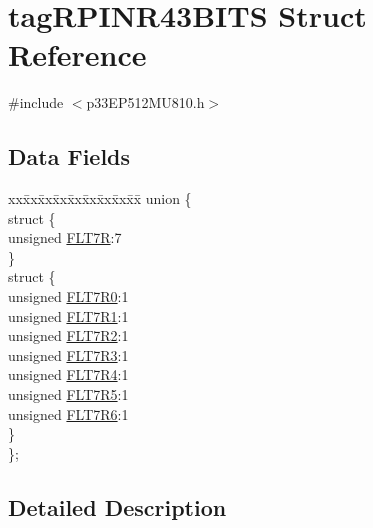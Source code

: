 \hypertarget{structtag_r_p_i_n_r43_b_i_t_s}{}\section{tag\+R\+P\+I\+N\+R43\+B\+I\+TS Struct Reference}
\label{structtag_r_p_i_n_r43_b_i_t_s}


{\ttfamily \#include $<$p33\+E\+P512\+M\+U810.\+h$>$}

\subsection*{Data Fields}
\begin{DoxyCompactItemize}
\item 
\begin{tabbing}
xx\=xx\=xx\=xx\=xx\=xx\=xx\=xx\=xx\=\kill
union \{\\
\>struct \{\\
\>\>unsigned \hyperlink{structtag_r_p_i_n_r43_b_i_t_s_a69c9f198ecb0e61ce06e583d0e993dcd}{FLT7R}:7\\
\>\} \\
\>struct \{\\
\>\>unsigned \hyperlink{structtag_r_p_i_n_r43_b_i_t_s_a13f428b3a00ff5353dbcf728b769bc5f}{FLT7R0}:1\\
\>\>unsigned \hyperlink{structtag_r_p_i_n_r43_b_i_t_s_a882c72c1643c60449eab8ceaac271a24}{FLT7R1}:1\\
\>\>unsigned \hyperlink{structtag_r_p_i_n_r43_b_i_t_s_a4fa074753620999bade01b1b44895632}{FLT7R2}:1\\
\>\>unsigned \hyperlink{structtag_r_p_i_n_r43_b_i_t_s_a49b644d4ca957f2864c2be933cd289e2}{FLT7R3}:1\\
\>\>unsigned \hyperlink{structtag_r_p_i_n_r43_b_i_t_s_ace27e549ad2cec595239e3d567e7a0d0}{FLT7R4}:1\\
\>\>unsigned \hyperlink{structtag_r_p_i_n_r43_b_i_t_s_a2064397eb9d480f80dc11382c657a362}{FLT7R5}:1\\
\>\>unsigned \hyperlink{structtag_r_p_i_n_r43_b_i_t_s_afef9add16b1f5bd5773823bcf939799a}{FLT7R6}:1\\
\>\} \\
\}; \\

\end{tabbing}\end{DoxyCompactItemize}


\subsection{Detailed Description}


